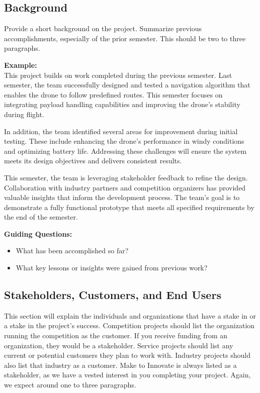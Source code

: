 \subsection{Background}
Provide a short background on the project. Summarize previous accomplishments, especially of the prior semester. This should be two to three paragraphs. 

\textbf{Example:} \\
This project builds on work completed during the previous semester. Last semester, the team successfully designed and tested a navigation algorithm that enables the drone to follow predefined routes. This semester focuses on integrating payload handling capabilities and improving the drone's stability during flight.

In addition, the team identified several areas for improvement during initial testing. These include enhancing the drone's performance in windy conditions and optimizing battery life. Addressing these challenges will ensure the system meets its design objectives and delivers consistent results.

This semester, the team is leveraging stakeholder feedback to refine the design. Collaboration with industry partners and competition organizers has provided valuable insights that inform the development process. The team's goal is to demonstrate a fully functional prototype that meets all specified requirements by the end of the semester.


\textbf{Guiding Questions:}
\begin{itemize}
    \item What has been accomplished so far?
    \item What key lessons or insights were gained from previous work?
\end{itemize}

\subsection{Stakeholders, Customers, and End Users}
This section will explain the individuals and organizations that have a stake in or a stake in the project's success. Competition projects should list the organization running the competition as the customer. If you receive funding from an organization, they would be a stakeholder. Service projects should list any current or potential customers they plan to work with. Industry projects should also list that industry as a customer. Make to Innovate is always listed as a stakeholder, as we have a vested interest in you completing your project. Again, we expect around one to three paragraphs.


